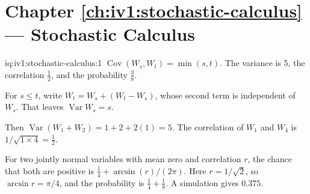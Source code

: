 \section*{Chapter \ref{ch:iv1:stochastic-calculus} --- Stochastic Calculus}

\begin{solution}{iq:iv1:stochastic-calculus:1}
$\operatorname{Cov}(W_s, W_t) = \min(s, t)$. The variance is 5, the correlation $\frac12$, and the probability $\frac38$.

For $s \le t$, write $W_t = W_s + (W_t - W_s)$, whose second term is independent of $W_s$. That leaves $\operatorname{Var}W_s = s$.

Then $\operatorname{Var}(W_1 + W_2) = 1 + 2 + 2(1) = 5$. The correlation of $W_1$ and $W_4$ is $1/\sqrt{1 \times 4} = \frac12$.

For two jointly normal variables with mean zero and correlation $r$, the chance that both are positive is $\frac14 + \arcsin(r)/(2\pi)$. Here $r = 1/\sqrt{2}$, so $\arcsin r = \pi/4$, and the probability is $\frac14 + \frac18$. A simulation gives $0.375$.



\end{solution}

